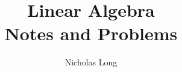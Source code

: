 

\usepackage[all]{xy}
\usepackage{color,graphicx}
%
\InstructorVersion
%
\newcommand\Rn{$\mathbb{R}^n$}
\newcommand\Rm{$\mathbb{R}^m$}
\newcommand\R{$\mathbb{R}$}
\newcommand\bq{\begin{question}}
\newcommand\eq{\end{question}}
\newcommand\be{\begin{enumerate}}
\newcommand\ee{\end{enumerate}}
\newtheorem{question}[theorem]{Question}
\renewcommand{\labelenumi}{\alph{enumi})}
\newcount\colveccount
\newcommand*\colvec[1]{
        \global\colveccount#1
        \begin{bmatrix}
        \colvecnext
}
\def\colvecnext#1{
        #1
        \global\advance\colveccount-1
        \ifnum\colveccount>0
                \\
                \expandafter\colvecnext
        \else
                \end{bmatrix}
        \fi
}


\large
\frontmatter
\title{Linear Algebra \\
Notes and Problems}
\author{Nicholas Long}
\maketitle
\tableofcontents

